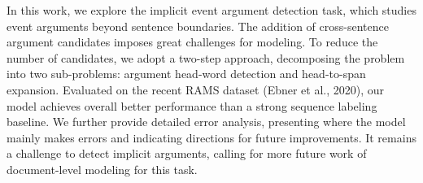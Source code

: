 In this work, we explore the implicit event argument detection task, which studies event arguments beyond sentence boundaries. The addition of cross-sentence argument candidates imposes great challenges for modeling. To reduce the number of candidates, we adopt a two-step approach, decomposing the problem into two sub-problems: argument head-word detection and head-to-span expansion. Evaluated on the recent RAMS dataset (Ebner et al., 2020), our model achieves overall better performance than a strong sequence labeling baseline. We further provide detailed error analysis, presenting where the model mainly makes errors and indicating directions for future improvements. It remains a challenge to detect implicit arguments, calling for more future work of document-level modeling for this task.
